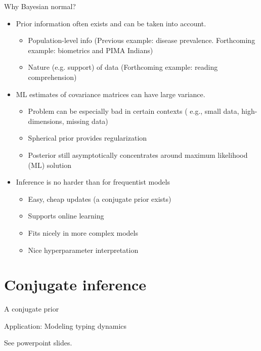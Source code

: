 \documentclass[10pt]{beamer}
\begin{document}
\begin{frame}{Why \alert{Bayesian} normal? }
\begin{itemize}
\item Prior information often exists and can be taken into account.
	\begin{itemize}
	\item Population-level info {\tiny (Previous example: disease prevalence.  Forthcoming example: biometrics and PIMA Indians)}
	\item Nature (e.g. support) of data {\tiny (Forthcoming example: reading comprehension)}
	\end{itemize} \pause 	
\item ML estimates of covariance matrices can have large variance.
	\begin{itemize}  
	\item Problem can be especially bad in certain contexts {\tiny ( e.g., small data, high-dimensions, missing data)}
	\item Spherical prior provides regularization
	\item Posterior still asymptotically concentrates around maximum likelihood (ML) solution
	\end{itemize} \pause 
\item Inference is no harder than for frequentist models
	\begin{itemize}
	\item Easy, cheap updates {\scriptsize (a conjugate prior exists)}
	\item Supports online learning 	
	\item Fits nicely in more complex models	
	\item Nice hyperparameter interpretation
	\end{itemize}
\end{itemize}	
\end{frame}

\section{Conjugate inference}

\begin{frame}{A conjugate prior}
\end{frame}

\begin{frame}{Application: Modeling typing dynamics}

See powerpoint slides.	
\end{frame}
\end{document}
